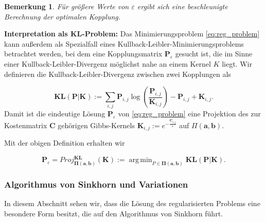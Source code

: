 \documentclass[twoside, 12pt,a4paper]{book}
\DeclareMathOperator*{\argmin}{arg\,min}
\newtheorem{remark}[theorem]{Bemerkung}
\numberwithin{equation}{section}
\begin{document}
	\begin{remark}
		Für größere Werte von $\varepsilon$ ergibt sich eine beschleunigte Berechnung der optimalen Kopplung.
	\end{remark}
	
	\noindent \textbf{Interpretation als KL-Problem:} Das Minimierungsproblem \eqref{eq:reg_problem} kann außerdem als Spezialfall eines Kullback-Leibler-Minimierungsproblems betrachtet werden, bei dem eine Kopplungsmatrix $\boldsymbol{P}_\varepsilon$ gesucht ist, die im Sinne einer Kullback-Leibler-Divergenz möglichst nahe an einem Kernel $K$ liegt.
	Wir definieren die Kullback-Leibler-Divergenz zwischen zwei  Kopplungen \cite{COTcuturi} als
	
	\begin{equation}
	\boldsymbol{KL}(\boldsymbol{P}|\boldsymbol{K}) := \sum_{i,j} \boldsymbol{P}_{i,j} \log \left(\frac{\boldsymbol{P}_{i,j}}{\boldsymbol{K}_{i,j}} \right) - \boldsymbol{P}_{i,j} + \boldsymbol{K}_{i,j}. \label{eq:KL_div_discrete}
	\end{equation}
	Damit ist die eindeutige Lösung $\boldsymbol{P}_\varepsilon$ von \autoref{eq:reg_problem} eine Projektion des zur Kostenmatrix $\boldsymbol{C}$ gehörigen Gibbs-Kernels $\boldsymbol{K}_{i,j} := e^{-\frac{\boldsymbol{C}_{i,j}}{\varepsilon}}$ auf $\Pi (\boldsymbol{a}, \boldsymbol{b})$.
	
	\noindent Mit der obigen Definition erhalten wir
	
	\begin{equation}
	\boldsymbol{P}_\varepsilon = Proj_{\boldsymbol{\Pi} (\boldsymbol{a}, \boldsymbol{b})}^{\boldsymbol{KL}}(\boldsymbol{K}) := \argmin_{P \in \boldsymbol{\Pi} (\boldsymbol{a}, \boldsymbol{b})}{\boldsymbol{KL}(\boldsymbol{P}|\boldsymbol{K})}.
	\end{equation}
	
	\subsubsection{Algorithmus von Sinkhorn und Variationen}
	In diesem Abschnitt sehen wir, dass die Lösung des regularisierten Problems eine besondere Form besitzt, die auf den Algorithmus von Sinkhorn führt.
	
	
\end{document}
